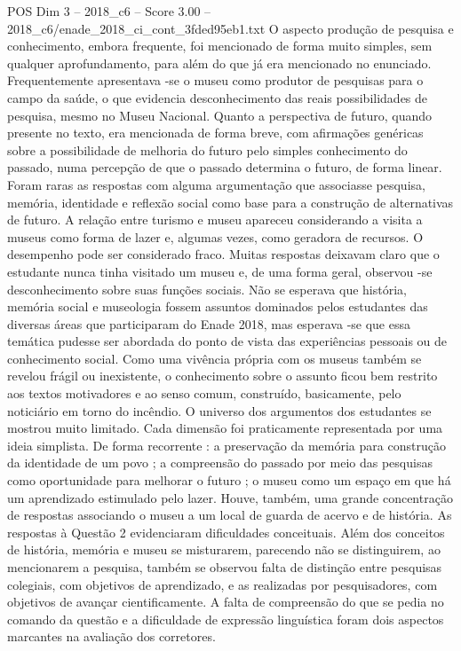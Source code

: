\begin{textsample}{POS Dim 3 – 2018\_c6 – Score 3.00 – 2018\_c6/enade\_2018\_ci\_cont\_3fded95eb1.txt}
O aspecto produção de pesquisa e conhecimento, embora frequente, foi mencionado de forma muito simples, sem qualquer aprofundamento, para além do que já era mencionado no enunciado.
Frequentemente apresentava -se o museu como produtor de pesquisas para o campo da saúde, o que evidencia desconhecimento das reais possibilidades de pesquisa, mesmo no Museu Nacional.
Quanto a perspectiva de futuro, quando presente no texto, era mencionada de forma breve, com afirmações genéricas sobre a possibilidade de melhoria do futuro pelo simples conhecimento do passado, numa percepção de que o passado determina o futuro, de forma linear.
Foram raras as respostas com alguma argumentação que associasse pesquisa, memória, identidade e reflexão social como base para a construção de alternativas de futuro.
A relação entre turismo e museu apareceu considerando a visita a museus como forma de lazer e, algumas vezes, como geradora de recursos.
O desempenho pode ser considerado fraco.
Muitas respostas deixavam claro que o estudante nunca tinha visitado um museu e, de uma forma geral, observou -se desconhecimento sobre suas funções sociais.
Não se esperava que história, memória social e museologia fossem assuntos dominados pelos estudantes das diversas áreas que participaram do Enade 2018, mas esperava -se que essa temática pudesse ser abordada do ponto de vista das experiências pessoais ou de conhecimento social.
Como uma vivência própria com os museus também se revelou frágil ou inexistente, o conhecimento sobre o assunto ficou bem restrito aos textos motivadores e ao senso comum, construído, basicamente, pelo noticiário em torno do incêndio.
O universo dos argumentos dos estudantes se mostrou muito limitado.
Cada dimensão foi praticamente representada por uma ideia simplista.
De forma recorrente : a preservação da memória para construção da identidade de um povo ; a compreensão do passado por meio das pesquisas como oportunidade para melhorar o futuro ; o museu como um espaço em que há um aprendizado estimulado pelo lazer.
Houve, também, uma grande concentração de respostas associando o museu a um local de guarda de acervo e de história.
As respostas à Questão 2 evidenciaram dificuldades conceituais.
Além dos conceitos de história, memória e museu se misturarem, parecendo não se distinguirem, ao mencionarem a pesquisa, também se observou falta de distinção entre pesquisas colegiais, com objetivos de aprendizado, e as realizadas por pesquisadores, com objetivos de avançar cientificamente.
A falta de compreensão do que se pedia no comando da questão e a dificuldade de expressão linguística foram dois aspectos marcantes na avaliação dos corretores.

\end{textsample}

